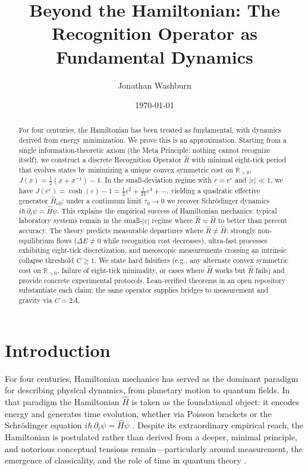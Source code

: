 \documentclass[aps,prx,twocolumn,superscriptaddress,nofootinbib]{revtex4-2}
\newcommand{\Rhat}{\hat{R}}
\newcommand{\Hhat}{\hat{H}}
\newcommand{\Jcost}{J}
\newcommand{\Ccost}{C}
\newcommand{\TauZero}{\tau_{0}}
\begin{document}
\title{Beyond the Hamiltonian: The Recognition Operator as Fundamental Dynamics}

\author{Jonathan Washburn}

\date{\today}

\begin{abstract}
For four centuries, the Hamiltonian has been treated as fundamental, with dynamics derived from energy minimization. We prove this is an approximation. Starting from a single information-theoretic axiom (the Meta Principle: nothing cannot recognize itself), we construct a discrete Recognition Operator \(\Rhat\) with minimal eight-tick period that evolves states by minimizing a unique convex symmetric cost on \(\mathbb{R}_{>0}\), \(\Jcost(x)=\tfrac12(x+x^{-1})-1\). In the small-deviation regime with \(r=e^{\varepsilon}\) and \(|\varepsilon|\ll 1\), we have \(\Jcost(e^{\varepsilon})=\cosh(\varepsilon)-1=\tfrac12\varepsilon^2+\tfrac1{24}\varepsilon^4+\cdots\), yielding a quadratic effective generator \(\Hhat_{\!\mathrm{eff}}\); under a continuum limit \(\TauZero\to 0\) we recover Schrödinger dynamics \(i\hbar\,\partial_t\psi=\Hhat\psi\). This explains the empirical success of Hamiltonian mechanics: typical laboratory systems remain in the small-\(|\varepsilon|\) regime where \(\Rhat\approx\Hhat\) to better than percent accuracy. The theory predicts measurable departures where \(\Rhat\neq\Hhat\): strongly non-equilibrium flows (\(\Delta E\neq 0\) while recognition cost decreases), ultra-fast processes exhibiting eight-tick discretization, and mesoscopic measurements crossing an intrinsic collapse threshold \(\Ccost\ge 1\). We state hard falsifiers (e.g., any alternate convex symmetric cost on \(\mathbb{R}_{>0}\), failure of eight-tick minimality, or cases where \(\Hhat\) works but \(\Rhat\) fails) and provide concrete experimental protocols. Lean-verified theorems in an open repository substantiate each claim; the same operator supplies bridges to measurement and gravity via \(\Ccost=2A\).
\end{abstract}

\maketitle

\section{Introduction}\label{sec:intro}
For four centuries, Hamiltonian mechanics has served as the dominant paradigm for describing physical dynamics, from planetary motion to quantum fields. In that paradigm the Hamiltonian \(\Hhat\) is taken as the foundational object: it encodes energy and generates time evolution, whether via Poisson brackets or the Schrödinger equation \(i\hbar\,\partial_t\psi=\Hhat\psi\) \cite{LandauMech,Jackson}. Despite its extraordinary empirical reach, the Hamiltonian is postulated rather than derived from a deeper, minimal principle, and notorious conceptual tensions remain---particularly around measurement, the emergence of classicality, and the role of time in quantum theory \cite{Penrose,Zurek,Leggett}.
\end{document}
